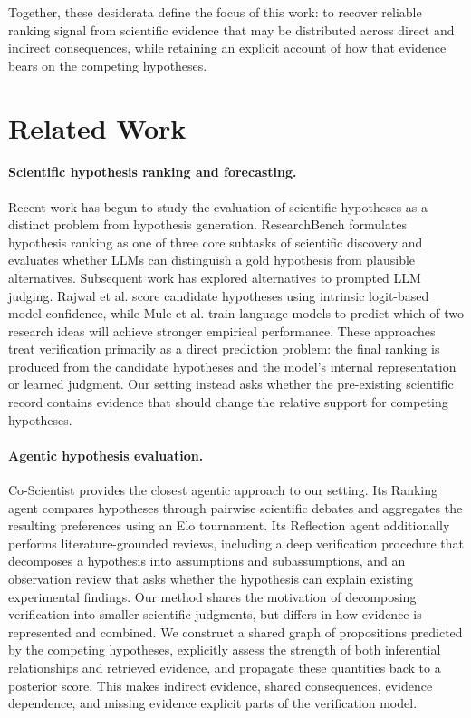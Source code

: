 \documentclass[twoside]{article}
\begin{document}
Together, these desiderata define the focus of this work: to recover reliable
ranking signal from scientific evidence that may be distributed across direct
and indirect consequences, while retaining an explicit account of how that
evidence bears on the competing hypotheses.

\section{Related Work}
\label{sec:related-work}

\paragraph{Scientific hypothesis ranking and forecasting.}
Recent work has begun to study the evaluation of scientific hypotheses as a
distinct problem from hypothesis generation. ResearchBench
\cite{liu2026researchbench} formulates hypothesis ranking as one of three core
subtasks of scientific discovery and evaluates whether LLMs can distinguish a
gold hypothesis from plausible alternatives. Subsequent work has explored
alternatives to prompted LLM judging. Rajwal et al.
\cite{rajwal2026logit} score candidate hypotheses using intrinsic
logit-based model confidence, while Mule et al.
\cite{mule2026forecasting} train language models to predict which of two
research ideas will achieve stronger empirical performance. These approaches
treat verification primarily as a direct prediction problem: the final ranking
is produced from the candidate hypotheses and the model's internal
representation or learned judgment. Our setting instead asks whether the
pre-existing scientific record contains evidence that should change the
relative support for competing hypotheses.

\paragraph{Agentic hypothesis evaluation.}
Co-Scientist \cite{gottweis2026coscientist} provides the closest agentic
approach to our setting. Its Ranking agent compares hypotheses through
pairwise scientific debates and aggregates the resulting preferences using an
Elo tournament. Its Reflection agent additionally performs literature-grounded
reviews, including a deep verification procedure that decomposes a hypothesis
into assumptions and subassumptions, and an observation review that asks
whether the hypothesis can explain existing experimental findings. Our method
shares the motivation of decomposing verification into smaller scientific
judgments, but differs in how evidence is represented and combined. We
construct a shared graph of propositions predicted by the competing
hypotheses, explicitly assess the strength of both inferential relationships and
retrieved evidence, and propagate these quantities back to a posterior score.
This makes indirect evidence, shared consequences, evidence dependence, and
missing evidence explicit parts of the verification model.
\end{document}
